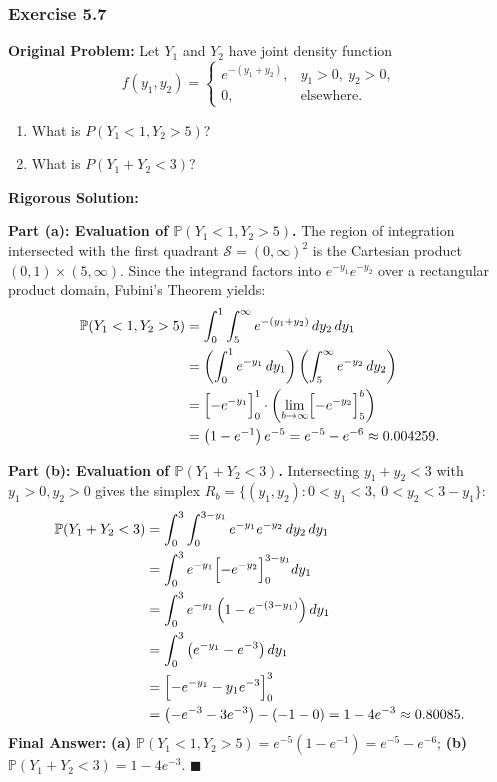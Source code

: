 \documentclass[11pt, letterpaper]{article}
\theoremstyle{definition}
\theoremstyle{remark}
\begin{document}
\bigskip

\subsubsection*{Exercise 5.7}
\textbf{Original Problem:} Let $Y_1$ and $Y_2$ have joint density function
\[
    f(y_1, y_2) = \begin{cases}
        e^{-(y_1 + y_2)}, & y_1 > 0,\ y_2 > 0, \\
        0, & \text{elsewhere.}
    \end{cases}
\]
\begin{enumerate}[label=\textbf{\alph*}]
    \item What is $P(Y_1 < 1, Y_2 > 5)$?
    \item What is $P(Y_1 + Y_2 < 3)$?
\end{enumerate}

\textbf{Rigorous Solution:}

\textbf{Part (a): Evaluation of $\mathbb{P}(Y_1 < 1, Y_2 > 5)$.}
The region of integration intersected with the first quadrant $\mathcal{S} = (0, \infty)^2$ is the Cartesian product $(0, 1) \times (5, \infty)$. Since the integrand factors into $e^{-y_1} e^{-y_2}$ over a rectangular product domain, Fubini's Theorem yields:
\begin{align*}
    \mathbb{P}(Y_1 < 1, Y_2 > 5) &= \int_{0}^{1} \int_{5}^{\infty} e^{-(y_1 + y_2)} \, dy_2 \, dy_1 \\
    &= \left( \int_{0}^{1} e^{-y_1} \, dy_1 \right) \left( \int_{5}^{\infty} e^{-y_2} \, dy_2 \right) \\
    &= \Bigl[ -e^{-y_1} \Bigr]_{0}^{1} \cdot \left( \lim_{b \to \infty} \Bigl[ -e^{-y_2} \Bigr]_{5}^{b} \right) \\
    &= \left( 1 - e^{-1} \right) e^{-5} = e^{-5} - e^{-6} \approx 0.004259.
\end{align*}

\textbf{Part (b): Evaluation of $\mathbb{P}(Y_1 + Y_2 < 3)$.}
Intersecting $y_1 + y_2 < 3$ with $y_1 > 0, y_2 > 0$ gives the simplex $R_b = \{(y_1, y_2) : 0 < y_1 < 3,\ 0 < y_2 < 3 - y_1\}$:
\begin{align*}
    \mathbb{P}(Y_1 + Y_2 < 3) &= \int_{0}^{3} \int_{0}^{3 - y_1} e^{-y_1} e^{-y_2} \, dy_2 \, dy_1 \\
    &= \int_{0}^{3} e^{-y_1} \Bigl[ -e^{-y_2} \Bigr]_{0}^{3 - y_1} dy_1 \\
    &= \int_{0}^{3} e^{-y_1} \left( 1 - e^{-(3 - y_1)} \right) dy_1 \\
    &= \int_{0}^{3} \left( e^{-y_1} - e^{-3} \right) dy_1 \\
    &= \Bigl[ -e^{-y_1} - y_1 e^{-3} \Bigr]_{0}^{3} \\
    &= \left( -e^{-3} - 3e^{-3} \right) - (-1 - 0) = 1 - 4e^{-3} \approx 0.80085.
\end{align*}
\textbf{Final Answer:} \textbf{(a)} $\mathbb{P}(Y_1 < 1, Y_2 > 5) = e^{-5}(1 - e^{-1}) = e^{-5} - e^{-6}$; \quad \textbf{(b)} $\mathbb{P}(Y_1 + Y_2 < 3) = 1 - 4e^{-3}$. $\blacksquare$
\end{document}
